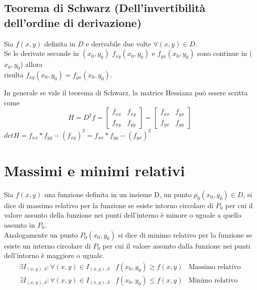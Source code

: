 \subsection{Teorema di Schwarz (Dell'invertibilità dell'ordine di derivazione)\label{Schwarz}}
\begin{teorema}
  Sia $f(x,y)$ definita in $D$ e derivabile due volte $\forall (x,y) \in D$.\\
  Se le derivate seconde in $(x_0,y_0)$ $f_{xy}(x_0,y_0)$ e $f_{yx}(x_0,y_0)$ sono continue in ($x_0,y_0$) allora\\
  risulta $f_{xy}(x_0,y_0)=f_{yx}(x_0,y_0)$.
\end{teorema}
In generale se vale il teorema di Schwarz, la matrice Hessiana può essere scritta come
\begin{equation*}
  H=D^2f=\begin{bmatrix}
           f_{xx} & f_{xy}\\
           f_{xy} & f_{yy}
         \end{bmatrix}
         = \begin{bmatrix}
             f_{xx} & f_{yx}\\
             f_{yx} & f_{yy}
           \end{bmatrix}
\end{equation*}
$det H= f_{xx}*f_{yy}-(f_{xy})^2=f_{xx}*f_{yy}-(f_{yx})^2$
\section{Massimi e minimi relativi \label{minmaxrel}}
\begin{defi}
  Sia $f(x,y)$ una funzione definita in un insieme D, un punto $p_0(x_0,y_0)\in D$, si dice di {\color{red}
    massimo relativo} per la funzione se esiste intorno circolare di $P_0$ per cui il valore assunto della
  funzione nei punti dell'interno è minore o uguale a quello assunto in $P_0$.\\
  Analogamente un punto $P_0(x_0,y_0)$ si dice di {\color{red} minimo relativo} per la funzione se esiste un
  interno circolare di $P_0$ per cui il valore assunto dalla funzione nei punti dell'intorno è maggiore o uguale.
  \begin{equation*}
    \begin{matrix}
      \exists I_{(x,y),\delta}:\forall (x,y)\in I_{(x,y),\delta} & f(x_0,y_0)\geq f(x,y) & \text{Massimo relativo}\\
      \exists I_{(x,y),\delta}:\forall (x,y)\in I_{(x,y),\delta} & f(x_0,y_0)\leq f(x,y) & \text{Minimo relativo}
    \end{matrix}
  \end{equation*} 
\end{defi}
